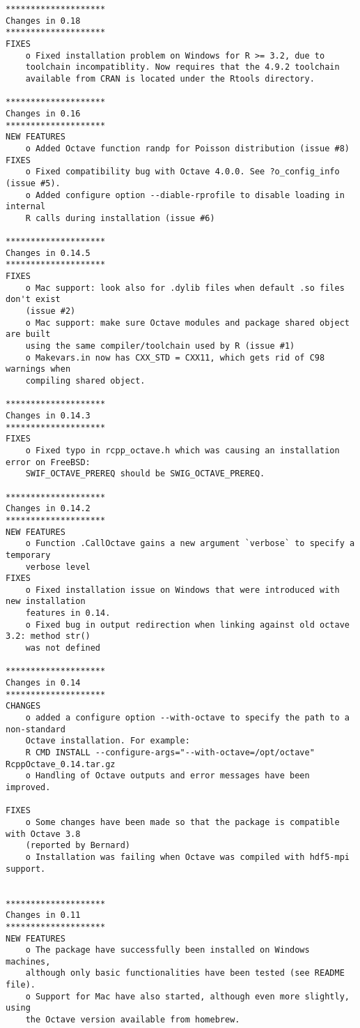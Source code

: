 \documentclass[english,10pt,a4paper]{article}\usepackage[]{graphicx}\usepackage[]{color}
\begin{document}
{\scriptsize
\begin{verbatim}
********************
Changes in 0.18
********************
FIXES
	o Fixed installation problem on Windows for R >= 3.2, due to 
	toolchain incompatiblity. Now requires that the 4.9.2 toolchain
	available from CRAN is located under the Rtools directory. 

********************
Changes in 0.16
********************
NEW FEATURES
    o Added Octave function randp for Poisson distribution (issue #8)
FIXES
    o Fixed compatibility bug with Octave 4.0.0. See ?o_config_info (issue #5).
    o Added configure option --diable-rprofile to disable loading in internal 
    R calls during installation (issue #6)   

********************
Changes in 0.14.5
********************
FIXES
    o Mac support: look also for .dylib files when default .so files don't exist
    (issue #2)
    o Mac support: make sure Octave modules and package shared object are built 
    using the same compiler/toolchain used by R (issue #1)
    o Makevars.in now has CXX_STD = CXX11, which gets rid of C98 warnings when 
    compiling shared object.  

********************
Changes in 0.14.3
********************
FIXES
    o Fixed typo in rcpp_octave.h which was causing an installation error on FreeBSD:
    SWIF_OCTAVE_PREREQ should be SWIG_OCTAVE_PREREQ.
    
********************
Changes in 0.14.2
********************
NEW FEATURES
    o Function .CallOctave gains a new argument `verbose` to specify a temporary 
    verbose level
FIXES
    o Fixed installation issue on Windows that were introduced with new installation
    features in 0.14.
    o Fixed bug in output redirection when linking against old octave 3.2: method str() 
    was not defined

********************
Changes in 0.14
********************
CHANGES
    o added a configure option --with-octave to specify the path to a non-standard
    Octave installation. For example:
    R CMD INSTALL --configure-args="--with-octave=/opt/octave" RcppOctave_0.14.tar.gz
    o Handling of Octave outputs and error messages have been improved.
    
FIXES
    o Some changes have been made so that the package is compatible with Octave 3.8
    (reported by Bernard)
    o Installation was failing when Octave was compiled with hdf5-mpi support.
    
    
********************
Changes in 0.11
********************
NEW FEATURES
    o The package have successfully been installed on Windows machines, 
    although only basic functionalities have been tested (see README file).
    o Support for Mac have also started, although even more slightly, using
    the Octave version available from homebrew.


\end{verbatim}}
\end{document}
